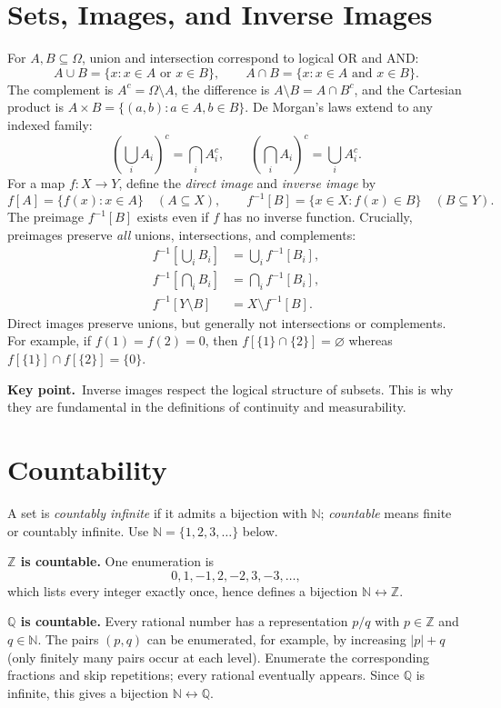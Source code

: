 \documentclass[10pt,a4paper]{article}
\newcommand{\N}{\mathbb N}
\newcommand{\Z}{\mathbb Z}
\newcommand{\Q}{\mathbb Q}
\newcommand{\key}[1]{\par\smallskip\textcolor{accent}{\textbf{Key point.}}\ #1\par}
\begin{document}
\section{Sets, Images, and Inverse Images}
For $A,B\subseteq\Omega$, union and intersection correspond to logical OR and AND:
\[
A\cup B=\{x:x\in A\text{ or }x\in B\},\qquad
A\cap B=\{x:x\in A\text{ and }x\in B\}.
\]
The complement is $A^c=\Omega\setminus A$, the difference is $A\setminus B=A\cap B^c$, and the Cartesian product is $A\times B=\{(a,b):a\in A,b\in B\}$. De Morgan's laws extend to any indexed family:
\[
\left(\bigcup_i A_i\right)^c=\bigcap_i A_i^c,
\qquad
\left(\bigcap_i A_i\right)^c=\bigcup_i A_i^c.
\]
For a map $f:X\to Y$, define the \emph{direct image} and \emph{inverse image} by
\[
f[A]=\{f(x):x\in A\}\quad (A\subseteq X),
\qquad
f^{-1}[B]=\{x\in X:f(x)\in B\}\quad (B\subseteq Y).
\]
The preimage $f^{-1}[B]$ exists even if $f$ has no inverse function. Crucially, preimages preserve \emph{all} unions, intersections, and complements:
\[
\boxed{\begin{aligned}
f^{-1}\!\left[\bigcup_i B_i\right]&=\bigcup_i f^{-1}[B_i],\\
f^{-1}\!\left[\bigcap_i B_i\right]&=\bigcap_i f^{-1}[B_i],\\
f^{-1}[Y\setminus B]&=X\setminus f^{-1}[B].
\end{aligned}}
\]
Direct images preserve unions, but generally not intersections or complements. For example, if $f(1)=f(2)=0$, then $f[\{1\}\cap\{2\}]=\varnothing$ whereas $f[\{1\}]\cap f[\{2\}]=\{0\}$.

\key{Inverse images respect the logical structure of subsets. This is why they are fundamental in the definitions of continuity and measurability.}

\section{Countability}
A set is \emph{countably infinite} if it admits a bijection with $\N$; \emph{countable} means finite or countably infinite. Use $\N=\{1,2,3,\ldots\}$ below.

\textbf{$\Z$ is countable.} One enumeration is
\[
0,1,-1,2,-2,3,-3,\ldots,
\]
which lists every integer exactly once, hence defines a bijection $\N\leftrightarrow\Z$.

\textbf{$\Q$ is countable.} Every rational number has a representation $p/q$ with $p\in\Z$ and $q\in\N$. The pairs $(p,q)$ can be enumerated, for example, by increasing $|p|+q$ (only finitely many pairs occur at each level). Enumerate the corresponding fractions and skip repetitions; every rational eventually appears. Since $\Q$ is infinite, this gives a bijection $\N\leftrightarrow\Q$.
\end{document}
